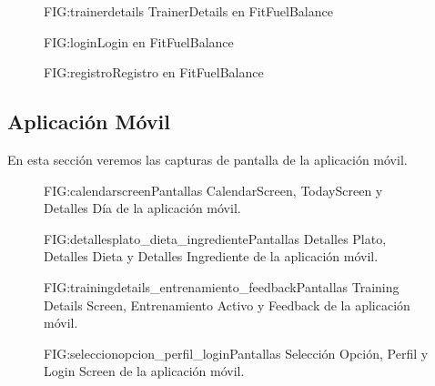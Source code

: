 \begin{figure}[TrainerDetails]{FIG:trainerdetails}{ TrainerDetails en FitFuelBalance}
\end{figure}

\begin{figure}[Login]{FIG:login}{Login en FitFuelBalance}
\end{figure}

\begin{figure}[Registro]{FIG:registro}{Registro en FitFuelBalance}
\end{figure}

\newpage
\subsection{Aplicación Móvil}

En esta sección veremos las capturas de pantalla de la aplicación móvil.

\begin{figure}[CalendarScreen, TodayScreen y Detalles Día]{FIG:calendarscreen}{Pantallas CalendarScreen, TodayScreen y Detalles Día de la aplicación móvil.}
\end{figure}

\begin{figure}[Detalles Plato, Detalles Dieta y Detalles Ingrediente]{FIG:detallesplato_dieta_ingrediente}{Pantallas Detalles Plato, Detalles Dieta y Detalles Ingrediente de la aplicación móvil.}
\end{figure}

\begin{figure}[Training Details Screen, Entrenamiento Activo y Feedback]{FIG:trainingdetails_entrenamiento_feedback}{Pantallas Training Details Screen, Entrenamiento Activo y Feedback de la aplicación móvil.}
\end{figure}

\begin{figure}[Selección Opción, Perfil y Login Screen]{FIG:seleccionopcion_perfil_login}{Pantallas Selección Opción, Perfil y Login Screen de la aplicación móvil.}
\end{figure}

\newpage
